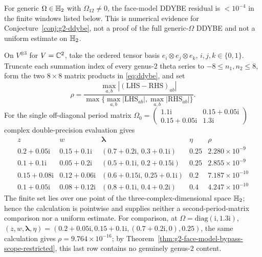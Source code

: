 \begin{proposition}
\label{prop:g2-generic-ddybe-finite-window-evidence}
For generic $\Omega\in\mathbb{H}_2$ with $\Omega_{12}\ne 0$, the
face-model DDYBE residual is \(<10^{-4}\) in the finite windows
listed below. This is numerical evidence for
Conjecture~\textup{\ref{conj:g2-ddybe}}, not a proof of the
full generic-$\Omega$ DDYBE and not a uniform estimate on
\(\mathbb{H}_2\).

On $V^{\otimes3}$ for $V=\mathbb{C}^2$, take the ordered tensor basis
$e_i\otimes e_j\otimes e_k$, $i,j,k\in\{0,1\}$.  Truncate each
summation index of every genus-$2$ theta series to
$-8\leq n_1,n_2\leq8$, form the two $8\times8$ matrix products in
\eqref{eq:ddybe}, and set
\[
 \rho=\frac{\max_{a,b}|(\mathrm{LHS}-\mathrm{RHS})_{ab}|}
 {\max\{\max_{a,b}|\mathrm{LHS}_{ab}|,
         \max_{a,b}|\mathrm{RHS}_{ab}|\}}.
\]
For the single off-diagonal period matrix
$\Omega_0 = \begin{pmatrix}1.1\mathrm{i} & 0.15+0.05\mathrm{i}\\
0.15+0.05\mathrm{i} & 1.3\mathrm{i}\end{pmatrix}$
complex double-precision evaluation gives
\[
\begin{array}{c|c|c|c|c}
z&w&\boldsymbol\lambda&\eta&\rho\\ \hline
0.2+0.05\mathrm i&0.15+0.1\mathrm i&(0.7+0.2\mathrm i,\,0.3+0.1\mathrm i)&0.25&2.280\times10^{-9}\\
0.1+0.1\mathrm i&0.05+0.2\mathrm i&(0.5+0.1\mathrm i,\,0.2+0.15\mathrm i)&0.25&2.855\times10^{-9}\\
0.15+0.08\mathrm i&0.12+0.06\mathrm i&(0.6+0.15\mathrm i,\,0.25+0.1\mathrm i)&0.2&7.187\times10^{-10}\\
0.1+0.05\mathrm i&0.08+0.12\mathrm i&(0.8+0.1\mathrm i,\,0.4+0.2\mathrm i)&0.4&4.247\times10^{-10}
\end{array}
\]
The finite set lies over one point of the
three-complex-dimensional space $\mathbb{H}_2$; hence the calculation is
pointwise and supplies neither a second-period-matrix comparison nor
a uniform estimate.  For comparison, at
$\Omega=\mathrm{diag}(\mathrm i,1.3\mathrm i)$,
$(z,w,\boldsymbol\lambda,\eta)=
(0.2+0.05\mathrm i,0.15+0.1\mathrm i,
(0.7+0.2\mathrm i,0),0.25)$, the same calculation gives
$\rho=9.764\times10^{-16}$; by
Theorem~\ref{thm:g2-face-model-bypass-scope-restricted}, this last row
contains no genuinely genus-$2$ content.
\end{proposition}

